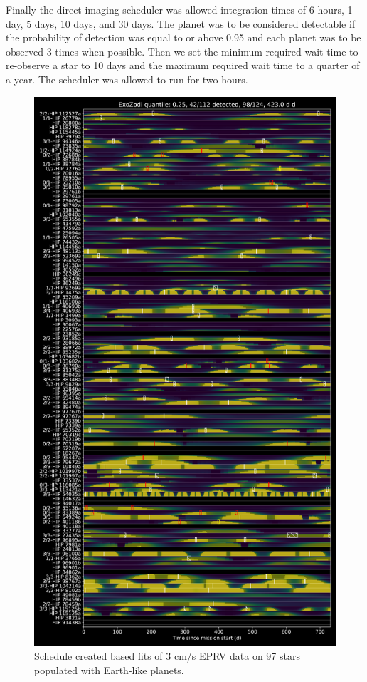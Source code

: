 Finally the direct imaging scheduler was allowed integration times of 6 hours,
1 day, 5 days, 10 days, and 30 days. The planet was to be considered detectable
if the probability of detection was equal to or above 0.95 and each planet was
to be observed 3 times when possible. Then we set the minimum required wait
time to re-observe a star to 10 days and the maximum required wait time to a
quarter of a year. The scheduler was allowed to run for two hours.

\begin{figure}
  \begin{center}
    \includegraphics[height=0.9\textheight]{ch4/figures/example_schedule.png}
  \end{center}
  \caption{
    Schedule created based fits of 3 cm/s EPRV data on 97 stars populated with
    Earth-like planets.
  }
  \label{fig:schedule}
\end{figure}

